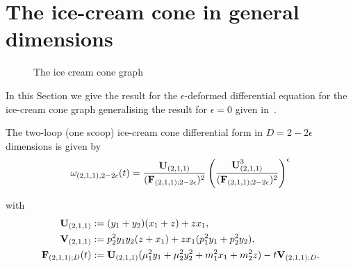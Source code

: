 \documentclass[a4paper,12pt]{article}
\numberwithin{equation}{section}
\numberwithin{figure}{section}
\begin{document}
     
\section{The ice-cream cone in general dimensions}\label{sec:ice-cream}

\begin{figure}[h]
  \centering
{}
\caption{The ice cream cone graph}\label{fig:icecream}
\end{figure}

In this Section we give the result for the $\epsilon$-deformed
differential equation for the ice-cream cone graph generalising the result
for $\epsilon=0$ given in~\cite{Lairez:2022zkj,Doran:2023yzu}.

The two-loop (one scoop) ice-cream cone  differential form in
$D=2-2\epsilon$ dimensions is given by
\begin{equation}
  \omega_{(2,1,1),  2-2\epsilon}(t)= {\textbf{U}_{(2,1,1)}\over
    (\textbf{F}_{(2,1,1);2-2\epsilon})^2} \left(\textbf{U}_{(2,1,1)}^3\over  (\textbf{F}_{(2,1,1);2-2\epsilon})^2\right)^{\epsilon}
\end{equation}

with
\begin{align}
  \textbf{U}_{(2,1,1)}&:=(y_1+y_2)(x_1+z)+zx_1,\cr
                        \textbf{V}_{(2,1,1)}&:=p_2^2y_1y_2(z+x_1)+zx_1(p_1^2y_1+p_2^2y_2),\\
\nonumber  \textbf{F}_{(2,1,1);D}(t)&:=\textbf{U}_{(2,1,1)}
                             (\mu_1^2y_1+\mu_2^2y_2^2+m_1^2x_1+m_2^2z)-t \textbf{V}_{(2,1,1);D}.
\end{align}
\end{document}
